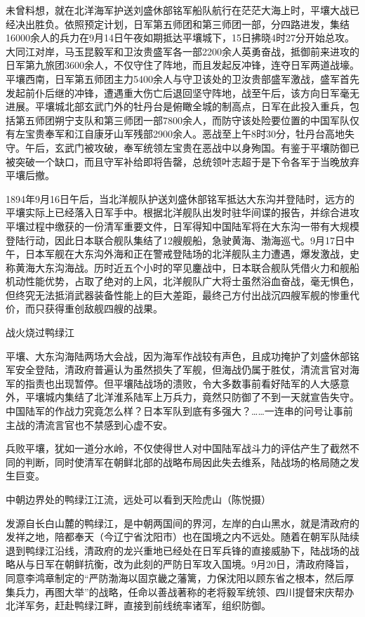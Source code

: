 \documentclass[12pt,UTF8]{ctexbook}
\begin{document}
未曾料想，就在北洋海军护送刘盛休部铭军船队航行在茫茫大海上时，平壤大战已经决出胜负。依照预定计划，日军第五师团和第三师团一部，分四路进发，集结16000余人的兵力在9月14日午夜如期抵达平壤城下，15日拂晓4时27分开始总攻。大同江对岸，马玉昆毅军和卫汝贵盛军各一部2200余人英勇奋战，抵御前来进攻的日军第九旅团3600余人，不仅守住了阵地，而且发起反冲锋，连夺日军两道战壕。平壤西南，日军第五师团主力5400余人与守卫该处的卫汝贵部盛军激战，盛军首先发起前仆后继的冲锋，遭遇重大伤亡后退回坚守阵地，战至午后，该方向日军毫无进展。平壤城北部玄武门外的牡丹台是俯瞰全城的制高点，日军在此投入重兵，包括第五师团朔宁支队和第三师团一部7800余人，而防守该处险要位置的中国军队仅有左宝贵奉军和江自康牙山军残部2900余人。恶战至上午8时30分，牡丹台高地失守。午后，玄武门被攻破，奉军统领左宝贵在恶战中以身殉国。有鉴于平壤防御已被突破一个缺口，而且守军补给即将告罄，总统领叶志超于是下令各军于当晚放弃平壤后撤。

1894年9月16日午后，当北洋舰队护送刘盛休部铭军抵达大东沟并登陆时，远方的平壤实际上已经落入日军手中。根据北洋舰队出发时驻华间谍的报告，并综合进攻平壤过程中缴获的一份清军重要文件，日军得知中国陆军将在大东沟一带有大规模登陆行动，因此日本联合舰队集结了12艘舰船，急驶黄海、渤海巡弋。9月17日中午，日本军舰在大东沟外海和正在警戒登陆场的北洋舰队主力遭遇，爆发激战，史称黄海大东沟海战。历时近五个小时的罕见鏖战中，日本联合舰队凭借火力和舰船机动性能优势，占取了绝对的上风，北洋舰队广大将士虽然浴血奋战，毫无惧色，但终究无法抵消武器装备性能上的巨大差距，最终己方付出战沉四艘军舰的惨重代价，而只获得重创敌舰四艘的战果。

战火烧过鸭绿江

平壤、大东沟海陆两场大会战，因为海军作战较有声色，且成功掩护了刘盛休部铭军安全登陆，清政府普遍认为虽然损失了军舰，但海战仍属于胜仗，清流言官对海军的指责也出现暂停。但平壤陆战场的溃败，令大多数事前看好陆军的人大感意外，平壤城内集结了北洋淮系陆军上万兵力，竟然只防御了不到一天就宣告失守。中国陆军的作战力究竟怎么样？日本军队到底有多强大？……一连串的问号让事前主战的清流言官也不禁感到心虚不安。

兵败平壤，犹如一道分水岭，不仅使得世人对中国陆军战斗力的评估产生了截然不同的判断，同时使清军在朝鲜北部的战略布局因此失去维系，陆战场的格局随之发生巨变。


中朝边界处的鸭绿江江流，远处可以看到天险虎山（陈悦摄）

发源自长白山麓的鸭绿江，是中朝两国间的界河，左岸的白山黑水，就是清政府的发祥之地，陪都奉天（今辽宁省沈阳市）也在国境之内不远处。随着在朝军队陆续退到鸭绿江沿线，清政府的龙兴重地已经处在日军兵锋的直接威胁下，陆战场的战略从与日军在朝鲜抗衡，改为此刻的严防日军攻入国境。9月20日，清政府降旨，同意李鸿章制定的“严防渤海以固京畿之藩篱，力保沈阳以顾东省之根本，然后厚集兵力，再图大举”的战略，任命以善战著称的老将毅军统领、四川提督宋庆帮办北洋军务，赶赴鸭绿江畔，直接到前线统率诸军，组织防御。
\end{document}
